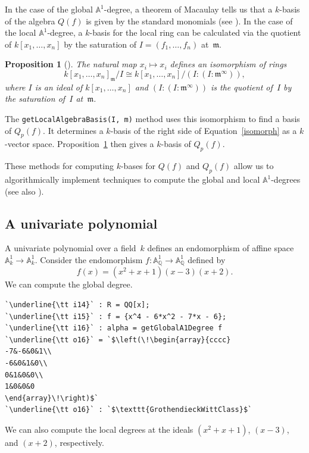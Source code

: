 \documentclass[12pt]{amsart}
\newtheorem{proposition}[theorem]{Proposition}
\theoremstyle{definition}
\begin{document}
In the case of the global $\mathbb{A}^{1}$-degree, a theorem of Macaulay tells us that a $k$-basis of the algebra $Q(f)$ is given by the standard monomials (see \cite[Proposition~2.1]{BS}). In the case of the local $\mathbb{A}^{1}$-degree, a $k$-basis for the local ring can be calculated via the quotient of $k[x_{1},\dots,x_{n}]$ by the saturation of $I=(f_{1},\dots,f_{n})$ at~$\mathfrak{m}$. 
\begin{proposition}[{\cite[Proposition~2.5]{BS}}]\label{prop: local basis}
The natural map $x_i\mapsto x_i$ defines an isomorphism of rings
\begin{equation}\label{isomorph}
k[x_{1},\dots,x_{n}]_{\mathfrak{m}}/I\cong k[x_{1},\dots,x_{n}]/(I:(I:\mathfrak{m}^{\infty})),
\end{equation}
where $I$ is an ideal of $k[x_{1},\dots,x_{n}]$ and $(I:(I:\mathfrak{m}^{\infty}))$ is the quotient of~$I$ by the saturation of~$I$ at~$\mathfrak{m}$. 
\end{proposition}
The 
\texttt{getLocalAlgebraBasis(I, m)} method uses this isomorphism to find a basis of $Q_p(f)$. It 
determines
a $k$-basis of the right side of Equation~\eqref{isomorph} as a $k$-vector space. Proposition~\ref{prop: local basis} then gives a $k$-basis of $Q_p(f)$.

These methods for computing $k$-bases for $Q(f)$ and $Q_{p}(f)$ allow us to algorithmically implement techniques to compute the global and local $\mathbb{A}^{1}$-degrees (see also \cite[Section~5A]{BMP}). 

\subsection{A univariate polynomial}\label{subsec: univariate} 
A univariate polynomial over a field~$k$ defines an endomorphism of affine space $\mathbb{A}^{1}_{k}\to\mathbb{A}^{1}_{k}$. Consider the endomorphism $f\colon\mathbb{A}^{1}_{\mathbb{Q}}\to\mathbb{A}^{1}_{\mathbb{Q}}$ defined by 
\[
f(x)=(x^{2}+x+1)(x-3)(x+2).
\]
We can compute the global degree.

\begin{lstlisting}[language=Macaulay2output]
`\underline{\tt i14}` : R = QQ[x];
`\underline{\tt i15}` : f = {x^4 - 6*x^2 - 7*x - 6};
`\underline{\tt i16}` : alpha = getGlobalA1Degree f
`\underline{\tt o16}` = `$\left(\!\begin{array}{cccc}
-7&-6&0&1\\
-6&0&1&0\\
0&1&0&0\\
1&0&0&0
\end{array}\!\right)$`
`\underline{\tt o16}` : `$\texttt{GrothendieckWittClass}$`
\end{lstlisting}
We can also compute the local degrees at the ideals $(x^{2}+x+1)$, $(x-3)$, and $(x+2)$, respectively.
\end{document}
